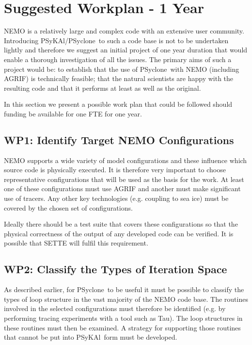 \documentclass{article}
\newcommand{\psykal}{{PS}y{KA}l}
\newcommand{\psyclone}{{PS}yclone}
\begin{document}
\section{Suggested Workplan - 1 Year}

NEMO is a relatively large and complex code with an extensive user
community. Introducing \psykal/\psyclone\ to such a code base is not to
be undertaken lightly and therefore we suggest an initial project of
one year duration that would enable a thorough investigation of all
the issues. The primary aims of such a project would be: to establish
that the use of \psyclone\ with NEMO (including AGRIF) is technically
feasible; that the natural scientists are happy with the resulting
code and that it performs at least as well as the original.

In this section we present a possible work plan that could be followed
should funding be available for one FTE for one year.

\subsection{WP1: Identify Target NEMO Configurations}
\label{wp1_target_configs}

NEMO supports a wide variety of model configurations and these
influence which source code is physically executed. It is therefore
very important to choose representative configurations that will be
used as the basis for the work. At least one of these configurations
must use AGRIF and another must make significant use of tracers.  Any
other key technologies (e.g. coupling to sea ice) must be covered by
the chosen set of configurations.

Ideally there should be a test suite that covers these configurations
so that the physical correctness of the output of any developed code
can be verified. It is possible that SETTE will fulfil this
requirement.

\subsection{WP2: Classify the Types of Iteration Space}
\label{wp2_classify}

As described earlier, for \psyclone\ to be useful it must be possible to
classify the types of loop structure in the vast majority of the NEMO
code base. The routines involved in the selected configurations must
therefore be identified (e.g. by performing tracing experiments with a
tool such as Tau). The loop structures in these routines must then be
examined. A strategy for supporting those routines that cannot be put
into \psykal\ form must be developed.
\end{document}
